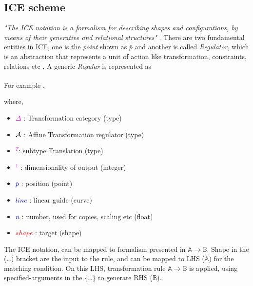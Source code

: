 \subsection{ICE scheme}
{\em "The ICE notation is a formalism for describing shapes and  configurations,  by  means  of  their  generative  and  relational  structures"} \cite{Hoda2005}.  There are two fundamental entities in ICE, one is the {\em point} shown as $\bar{p}$ and another is called {\em Regulator}, which is an abstraction that represents a unit of action like transformation, constraints, relations etc . A generic {\em Regular} is represented as \\

{}\\

	 For example ,

	
	where,
		\begin{itemize}[noitemsep,topsep=0pt,parsep=0pt,partopsep=0pt,label={}]
		\item 	\textcolor{magenta}{$\Delta$} : Transformation category (type)
	     	\item 	\textcolor{magenta}{${\bf \mathcal{A}}$} : Affine Transformation regulator (type)
		\item  	\textcolor{magenta}{$^T$}: subtype Translation (type)
		 \item 	\textcolor{magenta}{$^1$} : dimensionality of output (integer)
	        \item 	\textcolor{blue}{ $\bar{p}$} : position (point)
  		\item  	\textcolor{blue}{$line$} : linear guide (curve)
		 \item  	\textcolor{blue}{$n$} : number, used for copies, scaling etc (float)
		 \item  	\textcolor{red}{$shape$} : target (shape)
		\end{itemize}

The ICE notation, can be mapped to formalism presented in $\mathbb{A} \rightarrow \mathbb{B}$. Shape in the (\ldots) bracket are the input to the rule, and can be mapped to LHS ($\mathbb{A}$) for the matching condition. On this LHS, transformation rule $\mathbb{A} \rightarrow \mathbb{B}$ is applied, using specified-arguments in the \{\ldots\} to generate RHS ($\mathbb{B}$). 


